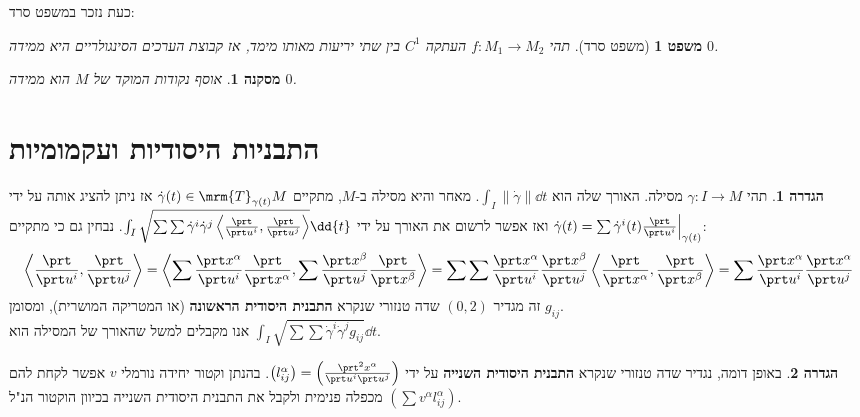 \documentclass{article}
\newtheorem{corollary}{מסקנה}
\newtheorem*{theorem*}{משפט}
\theoremstyle{definition}
\newtheorem*{definition*}{הגדרה}
\newcommand{\norm}[1]{\left\lVert#1\right\rVert}
\begin{document}
	כעת נזכר במשפט סרד:
	\begin{theorem*}[משפט סרד]
		תהי
		\(f:M_1\to M_2\)
		העתקה
		\(C^1\)
		בין שתי יריעות מאותו מימד,
		אז קבוצת הערכים הסינגולריים היא ממידה \(0\).
	\end{theorem*}

	\begin{corollary}
		אוסף נקודות המוקד של \(M\) הוא ממידה \(0\).
	\end{corollary}




	\section{התבניות היסודיות ועקמומיות}
	
	\begin{definition*}
		תהי
		\(\gamma: I \to M\)
		מסילה.
		האורך שלה הוא
		\(\int_I \norm{\dot\gamma} \dd{t}\).
		מאחר והיא מסילה ב-\(M\), מתקיים
		\(\dot\gamma(t) \in \mrm{T}_{\gamma(t)} M\)
		אז ניתן להציג אותה על ידי
		\(\dot\gamma(t)=\sum \dot{\gamma}^i(t) \frac{\prt}{\prt u^i}\Big|_{\gamma(t)} \)
		ואז אפשר לרשום את האורך על ידי
		\(\int_I \sqrt{
			\sum \sum \dot{\gamma}^i \dot{\gamma}^j \left\langle \frac{\prt}{\prt u^i},\frac{\prt}{\prt u^j} \right\rangle
		} \dd{t}\).
		נבחין גם כי מתקיים:
		\[
			\left\langle \frac{\prt}{\prt u^i},\frac{\prt}{\prt u^j} \right\rangle
			=
			\left\langle
				\sum \frac{\prt x^\alpha}{\prt u^i} \frac{\prt}{\prt x^\alpha},
				\sum \frac{\prt x^\beta}{\prt u^j} \frac{\prt}{\prt x^\beta}
			\right\rangle
			=
			\sum \sum \frac{\prt x^\alpha}{\prt u^i} \frac{\prt x^\beta}{\prt u^j}
			\left\langle \frac{\prt}{\prt x^\alpha}, \frac{\prt}{\prt x^\beta} \right\rangle
			=
			\sum \frac{\prt x^\alpha}{\prt u^i} \frac{\prt x^\alpha}{\prt u^j}
		\]
		זה מגדיר
		\((0,2)\)
		שדה טנזורי שנקרא \textbf{התבנית היסודית הראשונה} (או המטריקה המושרית), ומסומן
		\(g_{ij}\).
		\\
		אנו מקבלים למשל שהאורך של המסילה הוא
		\(\int_I \sqrt{
			\sum \sum \dot{\gamma}^i \dot{\gamma}^j g_{ij}
		} \dd{t}\).
	\end{definition*}

	\begin{definition*}
		באופן דומה, נגדיר שדה טנזורי שנקרא \textbf{התבנית היסודית השנייה} על ידי
		\(\left(l_{ij}^\alpha\right) = \left(\frac{\prt^2 x^\alpha}{\prt u^i \prt u^j}\right)\).
		בהנתן וקטור יחידה נורמלי \(v\) אפשר לקחת להם מכפלה פנימית ולקבל את התבנית היסודית השנייה בכיוון הוקטור הנ"ל
		\(\left(\sum v^\alpha l_{ij}^\alpha\right)\).
	\end{definition*}
\end{document}

